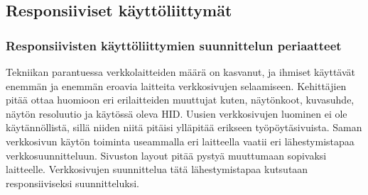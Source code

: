 \documentclass[11pt,a4paper,titlepage,oneside]{article}
\begin{document}






\newpage
{}%






\newpage
{}        %













\newpage
\subsection{Responsiiviset käyttöliittymät}        %


\subsubsection{Responsiivisten käyttöliittymien suunnittelun periaatteet}







Tekniikan parantuessa verkkolaitteiden määrä on kasvanut, ja ihmiset käyttävät enemmän ja enemmän eroavia laitteita verkkosivujen selaamiseen.\citemissing
Kehittäjien pitää ottaa huomioon eri erilaitteiden muuttujat kuten, näytönkoot, kuvasuhde, näytön resoluutio ja käytössä oleva HID.\citemissing
Uusien verkkosivujen luominen ei ole käytännöllistä, sillä niiden niitä pitäisi ylläpitää erikseen työpöytäsivuista.
Saman verkkosivun käytön toiminta useammalla eri laitteella vaatii eri lähestymistapaa verkkosuunnitteluun. 
Sivuston layout pitää pystyä muuttumaan sopivaksi laitteelle.
Verkkosivujen suunnittelua tätä lähestymistapaa kutsutaan responsiiviseksi suunnitteluksi. \citemissing
\medskip
\end{document}
